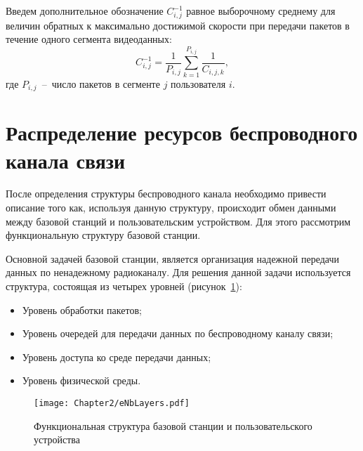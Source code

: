 
Введем дополнительное обозначение $C_{i,j}^{-1}$ равное выборочному среднему для величин обратных к максимально достижимой скорости при передачи пакетов в течение одного сегмента видеоданных:
\begin{equation}
\nonumber
C_{i,j}^{-1} = \frac{1}{P_{i,j}}\sum\limits_{k=1}^{P_{i,j}} \frac{1}{C_{i,j,k}},
\label{eq:ChannelConst_v1}
\end{equation}
где $P_{i,j}$~--~число пакетов в сегменте $j$ пользователя $i$.

\section{Распределение ресурсов беспроводного канала связи}
\label{chap2:Scheduler}

После определения структуры беспроводного канала необходимо привести описание того как, используя данную структуру, происходит обмен данными между базовой станций и пользовательским устройством. Для этого рассмотрим функциональную структуру базовой станции.

Основной задачей базовой станции, является организация надежной передачи данных по ненадежному радиоканалу. Для решения данной задачи используется структура, состоящая из четырех уровней (рисунок~\ref{fig:eNbLayers}):
\begin{itemize}
	\item Уровень обработки пакетов;
	\item Уровень очередей для передачи данных по беспроводному каналу связи;
	\item Уровень доступа ко среде передачи данных;
	\item Уровень физической среды.
\end{itemize}

\begin{figure}[htbp]
\begin{center}
\texttt{[image: Chapter2/eNbLayers.pdf]}
\caption{Функциональная структура базовой станции и пользовательского устройства}
\label{fig:eNbLayers}
\end{center}
\end{figure}

